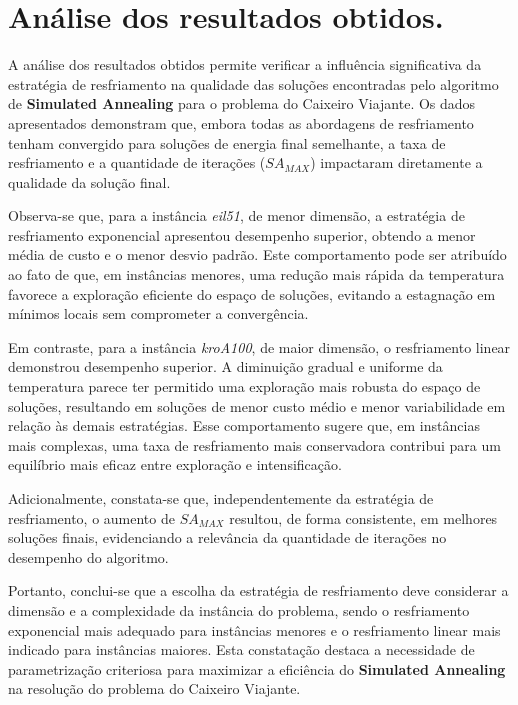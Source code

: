 \documentclass[12pt]{article}
\begin{document}
\section{Análise dos resultados obtidos.}
\label{sec:analise_dos_resultados_obtidos}

A análise dos resultados obtidos permite verificar a influência significativa da estratégia de resfriamento na qualidade das soluções encontradas pelo algoritmo de \textbf{Simulated Annealing} para o problema do Caixeiro Viajante. Os dados apresentados demonstram que, embora todas as abordagens de resfriamento tenham convergido para soluções de energia final semelhante, a taxa de resfriamento e a quantidade de iterações (\( SA_{MAX} \)) impactaram diretamente a qualidade da solução final.

Observa-se que, para a instância \textit{eil51}, de menor dimensão, a estratégia de resfriamento exponencial apresentou desempenho superior, obtendo a menor média de custo e o menor desvio padrão. Este comportamento pode ser atribuído ao fato de que, em instâncias menores, uma redução mais rápida da temperatura favorece a exploração eficiente do espaço de soluções, evitando a estagnação em mínimos locais sem comprometer a convergência.

Em contraste, para a instância \textit{kroA100}, de maior dimensão, o resfriamento linear demonstrou desempenho superior. A diminuição gradual e uniforme da temperatura parece ter permitido uma exploração mais robusta do espaço de soluções, resultando em soluções de menor custo médio e menor variabilidade em relação às demais estratégias. Esse comportamento sugere que, em instâncias mais complexas, uma taxa de resfriamento mais conservadora contribui para um equilíbrio mais eficaz entre exploração e intensificação.

Adicionalmente, constata-se que, independentemente da estratégia de resfriamento, o aumento de \( SA_{MAX} \) resultou, de forma consistente, em melhores soluções finais, evidenciando a relevância da quantidade de iterações no desempenho do algoritmo.

Portanto, conclui-se que a escolha da estratégia de resfriamento deve considerar a dimensão e a complexidade da instância do problema, sendo o resfriamento exponencial mais adequado para instâncias menores e o resfriamento linear mais indicado para instâncias maiores. Esta constatação destaca a necessidade de parametrização criteriosa para maximizar a eficiência do \textbf{Simulated Annealing} na resolução do problema do Caixeiro Viajante.
\end{document}

